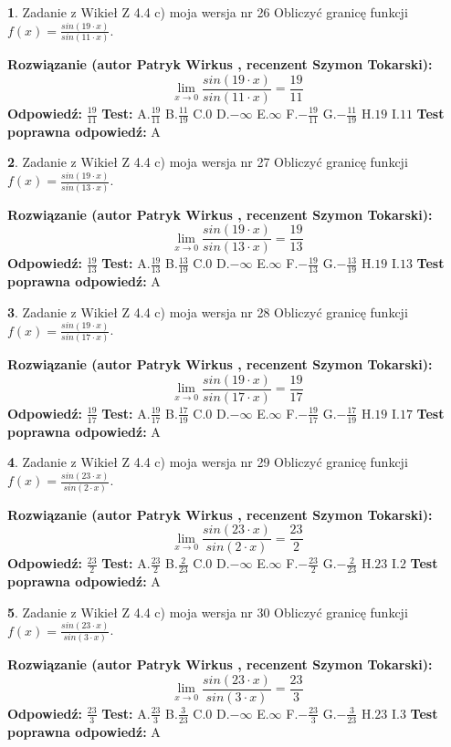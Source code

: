 \documentclass[12pt, a4paper]{article}
\theoremstyle{definition} %
\newtheorem{zad}{}
\newcommand{\zadStart}[1]{\begin{zad}#1\newline}
\newcommand{\zadStop}{\end{zad}}
\newcommand{\rozwStart}[2]{\noindent \textbf{Rozwiązanie (autor #1 , recenzent #2): }\newline}
\newcommand{\rozwStop}{\newline}
\newcommand{\odpStart}{\noindent \textbf{Odpowiedź:}\newline}
\newcommand{\odpStop}{\newline}
\newcommand{\testStart}{\noindent \textbf{Test:}\newline}
\newcommand{\testStop}{\newline}
\newcommand{\kluczStart}{\noindent \textbf{Test poprawna odpowiedź:}\newline}
\newcommand{\kluczStop}{\newline}
\begin{document}
\zadStart{Zadanie z Wikieł Z 4.4 c) moja wersja nr 26}
Obliczyć granicę funkcji $f(x)=\frac{sin(19\cdot x)}{sin(11\cdot x)}$.
\zadStop
\rozwStart{Patryk Wirkus}{Szymon Tokarski}
$$\lim\limits_{x\to 0}\frac{sin(19\cdot x)}{sin(11\cdot x)}=
\frac{19}{11}$$
\rozwStop
\odpStart
$\frac{19}{11}$
\odpStop
\testStart
A.$\frac{19}{11}$
B.$\frac{11}{19}$
C.$0$
D.$-\infty$
E.$\infty$
F.$-\frac{19}{11}$
G.$-\frac{11}{19}$
H.$19$
I.$11$
\testStop
\kluczStart
A
\kluczStop



\zadStart{Zadanie z Wikieł Z 4.4 c) moja wersja nr 27}
Obliczyć granicę funkcji $f(x)=\frac{sin(19\cdot x)}{sin(13\cdot x)}$.
\zadStop
\rozwStart{Patryk Wirkus}{Szymon Tokarski}
$$\lim\limits_{x\to 0}\frac{sin(19\cdot x)}{sin(13\cdot x)}=
\frac{19}{13}$$
\rozwStop
\odpStart
$\frac{19}{13}$
\odpStop
\testStart
A.$\frac{19}{13}$
B.$\frac{13}{19}$
C.$0$
D.$-\infty$
E.$\infty$
F.$-\frac{19}{13}$
G.$-\frac{13}{19}$
H.$19$
I.$13$
\testStop
\kluczStart
A
\kluczStop



\zadStart{Zadanie z Wikieł Z 4.4 c) moja wersja nr 28}
Obliczyć granicę funkcji $f(x)=\frac{sin(19\cdot x)}{sin(17\cdot x)}$.
\zadStop
\rozwStart{Patryk Wirkus}{Szymon Tokarski}
$$\lim\limits_{x\to 0}\frac{sin(19\cdot x)}{sin(17\cdot x)}=
\frac{19}{17}$$
\rozwStop
\odpStart
$\frac{19}{17}$
\odpStop
\testStart
A.$\frac{19}{17}$
B.$\frac{17}{19}$
C.$0$
D.$-\infty$
E.$\infty$
F.$-\frac{19}{17}$
G.$-\frac{17}{19}$
H.$19$
I.$17$
\testStop
\kluczStart
A
\kluczStop



\zadStart{Zadanie z Wikieł Z 4.4 c) moja wersja nr 29}
Obliczyć granicę funkcji $f(x)=\frac{sin(23\cdot x)}{sin(2\cdot x)}$.
\zadStop
\rozwStart{Patryk Wirkus}{Szymon Tokarski}
$$\lim\limits_{x\to 0}\frac{sin(23\cdot x)}{sin(2\cdot x)}=
\frac{23}{2}$$
\rozwStop
\odpStart
$\frac{23}{2}$
\odpStop
\testStart
A.$\frac{23}{2}$
B.$\frac{2}{23}$
C.$0$
D.$-\infty$
E.$\infty$
F.$-\frac{23}{2}$
G.$-\frac{2}{23}$
H.$23$
I.$2$
\testStop
\kluczStart
A
\kluczStop



\zadStart{Zadanie z Wikieł Z 4.4 c) moja wersja nr 30}
Obliczyć granicę funkcji $f(x)=\frac{sin(23\cdot x)}{sin(3\cdot x)}$.
\zadStop
\rozwStart{Patryk Wirkus}{Szymon Tokarski}
$$\lim\limits_{x\to 0}\frac{sin(23\cdot x)}{sin(3\cdot x)}=
\frac{23}{3}$$
\rozwStop
\odpStart
$\frac{23}{3}$
\odpStop
\testStart
A.$\frac{23}{3}$
B.$\frac{3}{23}$
C.$0$
D.$-\infty$
E.$\infty$
F.$-\frac{23}{3}$
G.$-\frac{3}{23}$
H.$23$
I.$3$
\testStop
\kluczStart
A
\kluczStop
\end{document}
